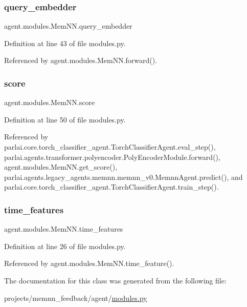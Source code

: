\subsubsection{\texorpdfstring{query\+\_\+embedder}{query\_embedder}}
{\footnotesize\ttfamily agent.\+modules.\+Mem\+N\+N.\+query\+\_\+embedder}



Definition at line 43 of file modules.\+py.



Referenced by agent.\+modules.\+Mem\+N\+N.\+forward().

\mbox{\label{classagent_1_1modules_1_1MemNN_a3fcb2d3675f76c96af9962b08193c6ec}} 
\subsubsection{\texorpdfstring{score}{score}}
{\footnotesize\ttfamily agent.\+modules.\+Mem\+N\+N.\+score}



Definition at line 50 of file modules.\+py.



Referenced by parlai.\+core.\+torch\+\_\+classifier\+\_\+agent.\+Torch\+Classifier\+Agent.\+eval\+\_\+step(), parlai.\+agents.\+transformer.\+polyencoder.\+Poly\+Encoder\+Module.\+forward(), agent.\+modules.\+Mem\+N\+N.\+get\+\_\+score(), parlai.\+agents.\+legacy\+\_\+agents.\+memnn.\+memnn\+\_\+v0.\+Memnn\+Agent.\+predict(), and parlai.\+core.\+torch\+\_\+classifier\+\_\+agent.\+Torch\+Classifier\+Agent.\+train\+\_\+step().

\mbox{\label{classagent_1_1modules_1_1MemNN_a9fb8309c555b3c48d1c9f3a711efd8c3}} 
\subsubsection{\texorpdfstring{time\+\_\+features}{time\_features}}
{\footnotesize\ttfamily agent.\+modules.\+Mem\+N\+N.\+time\+\_\+features}



Definition at line 26 of file modules.\+py.



Referenced by agent.\+modules.\+Mem\+N\+N.\+time\+\_\+feature().



The documentation for this class was generated from the following file\+:\begin{DoxyCompactItemize}
\item 
projects/memnn\+\_\+feedback/agent/\hyperlink{projects_2memnn__feedback_2agent_2modules_8py}{modules.\+py}\end{DoxyCompactItemize}
